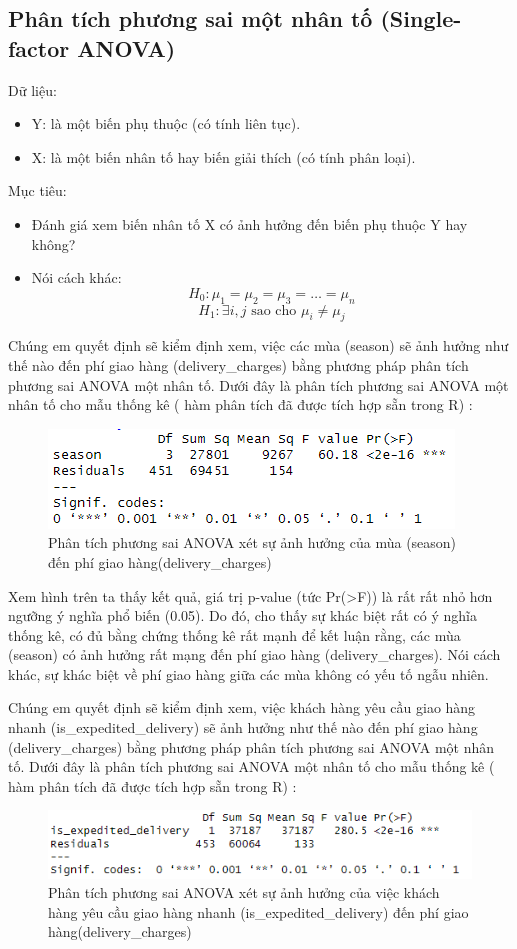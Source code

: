 \subsection{Phân tích phương sai một nhân tố (Single-factor ANOVA)}

Dữ liệu:
\begin{itemize}
    \item Y: là một biến phụ thuộc (có tính liên tục).
    \item X: là một biến nhân tố hay biến giải thích (có tính phân loại).
\end{itemize}
Mục tiêu:
\begin{itemize}
    \item Đánh giá xem biến nhân tố X có ảnh hưởng đến biến phụ thuộc Y hay không?
    \item Nói cách khác:
    \[
        H_{0}: \mu_{1} = \mu_{2} = \mu_{3} = \dots = \mu_{n}
        \]
        \[
        H_{1}: \exists i, j \text{ sao cho } \mu_{i} \neq \mu_{j}
        \]
\end{itemize}
Chúng em quyết định sẽ kiểm định xem, việc các mùa (season) sẽ ảnh hưởng như thế nào đến phí giao hàng (delivery\_charges) bằng phương pháp phân tích phương sai ANOVA một nhân tố. Dưới đây là phân tích phương sai ANOVA một nhân tố cho mẫu thống kê ( hàm phân tích đã được tích hợp sẵn trong R) :

\begin{figure}[!htbp]
    \centering
    \includegraphics[width=0.4\linewidth]{graphics/5.3.1.png}
    \caption{Phân tích phương sai ANOVA xét sự ảnh hưởng của mùa (season) đến phí giao hàng(delivery\_charges)}
\end{figure}

Xem hình trên ta thấy kết quả, giá trị p-value (tức Pr(>F)) là rất rất nhỏ hơn ngưỡng ý nghĩa phổ biến (0.05). Do đó, cho thấy sự khác biệt rất có ý nghĩa thống kê, có đủ bằng chứng thống kê rất mạnh để kết luận rằng, các mùa (season) có ảnh hưởng rất mạng đến phí giao hàng (delivery\_charges). Nói cách khác, sự khác biệt về phí giao hàng giữa các mùa không có yếu tố ngẫu nhiên.


Chúng em quyết định sẽ kiểm định xem, việc khách hàng yêu cầu giao hàng nhanh (is\_expedited\_delivery) sẽ ảnh hưởng như thế nào đến phí giao hàng (delivery\_charges) bằng phương pháp phân tích phương sai ANOVA một nhân tố. Dưới đây là phân tích phương sai ANOVA một nhân tố cho mẫu thống kê ( hàm phân tích đã được tích hợp sẵn trong R) :
\begin{figure}[!htbp]
    \centering
    \includegraphics[width=0.4\linewidth]{graphics/5.3.2.png}
    \caption{Phân tích phương sai ANOVA xét sự ảnh hưởng của việc khách hàng yêu cầu giao hàng nhanh (is\_expedited\_delivery) đến phí giao hàng(delivery\_charges)}
\end{figure}

